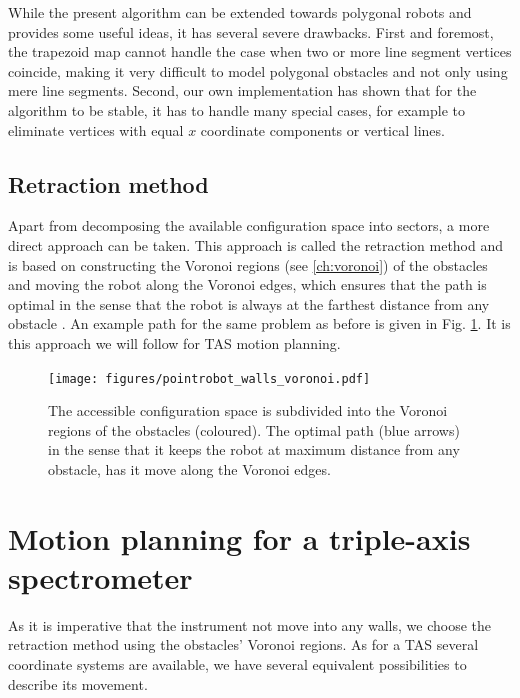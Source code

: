 While the present algorithm can be extended towards polygonal robots \cite[Ch. 13.3, pp. 290-297]{Berg2008} and provides
some useful ideas, it has several severe drawbacks. First and foremost, the trapezoid map cannot handle the case when
two or more line segment vertices coincide, making it very difficult to model polygonal obstacles and not only using mere
line segments. Second, our own implementation has shown that for the algorithm to be stable, it has to handle many 
special cases, for example to eliminate vertices with equal $x$ coordinate components or vertical lines.

\vspace{0.5cm}

\subsection*{Retraction method}
Apart from decomposing the available configuration space into sectors, a more direct approach can be taken. This
approach is called the retraction method and is based on constructing the Voronoi regions (see \ref{ch:voronoi})
of the obstacles and moving the robot along the Voronoi edges, which ensures that the path is optimal in the
sense that the robot is always at the farthest distance from any obstacle \cite[pp. 163 and 304]{Berg2008}.
An example path for the same problem as before is given in Fig. \ref{fig:robot_voronoi}.
It is this approach we will follow for TAS motion planning.

\begin{figure}[htb]
	\centering
	\texttt{[image: figures/pointrobot\_walls\_voronoi.pdf]}
	\caption{The accessible configuration space is subdivided into the Voronoi regions of the obstacles (coloured). The optimal
		path (blue arrows) in the sense that it keeps the robot at maximum distance from any obstacle, has it move along the 
		Voronoi edges.}
	\label{fig:robot_voronoi}
\end{figure}



\section{Motion planning for a triple-axis spectrometer}
\label{sec:tasrobot}

As it is imperative that the instrument not move into any walls, we choose the retraction method using the obstacles' Voronoi regions.
As for a TAS several coordinate systems are available, we have several equivalent possibilities to describe its movement. 

